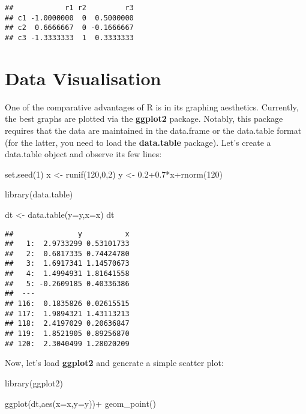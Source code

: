 \documentclass[
  oneside]{book}
\newenvironment{Shaded}{\begin{snugshade}}{\end{snugshade}}
\newcommand{\AttributeTok}[1]{\textcolor[rgb]{0.77,0.63,0.00}{#1}}
\newcommand{\DecValTok}[1]{\textcolor[rgb]{0.00,0.00,0.81}{#1}}
\newcommand{\FloatTok}[1]{\textcolor[rgb]{0.00,0.00,0.81}{#1}}
\newcommand{\FunctionTok}[1]{\textcolor[rgb]{0.00,0.00,0.00}{#1}}
\newcommand{\NormalTok}[1]{#1}
\newcommand{\OtherTok}[1]{\textcolor[rgb]{0.56,0.35,0.01}{#1}}
\newcommand{\SpecialCharTok}[1]{\textcolor[rgb]{0.00,0.00,0.00}{#1}}
\begin{document}
\begin{verbatim}
##            r1 r2         r3
## c1 -1.0000000  0  0.5000000
## c2  0.6666667  0 -0.1666667
## c3 -1.3333333  1  0.3333333
\end{verbatim}

\hypertarget{data-visualisation}{%
\section*{Data Visualisation}\label{data-visualisation}}

One of the comparative advantages of R is in its graphing aesthetics. Currently, the best graphs are plotted via the \textbf{ggplot2} package. Notably, this package requires that the data are maintained in the data.frame or the data.table format (for the latter, you need to load the \textbf{data.table} package). Let's create a data.table object and observe its few lines:

\begin{Shaded}
\begin{Highlighting}[]
\FunctionTok{set.seed}\NormalTok{(}\DecValTok{1}\NormalTok{)}
\NormalTok{x }\OtherTok{\textless{}{-}} \FunctionTok{runif}\NormalTok{(}\DecValTok{120}\NormalTok{,}\DecValTok{0}\NormalTok{,}\DecValTok{2}\NormalTok{)}
\NormalTok{y }\OtherTok{\textless{}{-}} \FloatTok{0.2+0.7}\SpecialCharTok{*}\NormalTok{x}\SpecialCharTok{+}\FunctionTok{rnorm}\NormalTok{(}\DecValTok{120}\NormalTok{)}

\FunctionTok{library}\NormalTok{(data.table)}

\NormalTok{dt }\OtherTok{\textless{}{-}} \FunctionTok{data.table}\NormalTok{(}\AttributeTok{y=}\NormalTok{y,}\AttributeTok{x=}\NormalTok{x)}
\NormalTok{dt}
\end{Highlighting}
\end{Shaded}

\begin{verbatim}
##               y          x
##   1:  2.9733299 0.53101733
##   2:  0.6817335 0.74424780
##   3:  1.6917341 1.14570673
##   4:  1.4994931 1.81641558
##   5: -0.2609185 0.40336386
##  ---                      
## 116:  0.1835826 0.02615515
## 117:  1.9894321 1.43113213
## 118:  2.4197029 0.20636847
## 119:  1.8521905 0.89256870
## 120:  2.3040499 1.28020209
\end{verbatim}

Now, let's load \textbf{ggplot2} and generate a simple scatter plot:

\begin{Shaded}
\begin{Highlighting}[]
\FunctionTok{library}\NormalTok{(ggplot2)}

\FunctionTok{ggplot}\NormalTok{(dt,}\FunctionTok{aes}\NormalTok{(}\AttributeTok{x=}\NormalTok{x,}\AttributeTok{y=}\NormalTok{y))}\SpecialCharTok{+}
  \FunctionTok{geom\_point}\NormalTok{()}
\end{Highlighting}
\end{Shaded}
\end{document}
